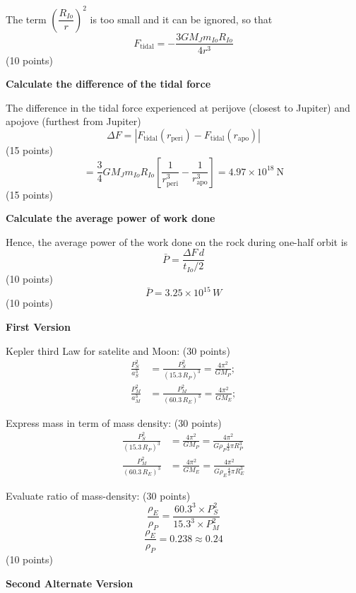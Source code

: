 The term $\left(\dfrac{R_{Io}}{r}\right)^2$ is too small and it can be
ignored, so that
\[
  F_{\mathrm{tidal}} = -\frac{3GM_J m_{Io} R_{Io}}{4r^3}
\]
\hfill(10 points)

\medskip
\textbf{Calculate the difference of the tidal force}

The difference in the tidal force experienced at perijove (closest to Jupiter)
and apojove (furthest from Jupiter)
\[
  \Delta F = \left|F_{\mathrm{tidal}}(r_{\mathrm{peri}})
    - F_{\mathrm{tidal}}(r_{\mathrm{apo}})\right|
\]
\hfill(15 points)
\[
  = \frac{3}{4}GM_J m_{Io} R_{Io}
    \left[\frac{1}{r_{\mathrm{peri}}^3} - \frac{1}{r_{\mathrm{apo}}^3}\right]
  = 4.97\times10^{18}\ \mathrm{N}
\]
\hfill(15 points)

\medskip
\textbf{Calculate the average power of work done}

Hence, the average power of the work done on the rock during one-half orbit
is
\[
  \bar P = \frac{\Delta F\,d}{t_{Io}/2}
\]
\hfill(10 points)
\[
  \bar P = 3.25\times10^{15}\,W
\]
\hfill(10 points)

\textbf{First Version}

Kepler third Law for satelite %
and Moon: \hfill(30 points)
\begin{align*}
  \frac{P_S^2}{a_S^3} &= \frac{P_S^2}{(15.3\,R_P)^3} = \frac{4\pi^2}{GM_P}; \\
  \frac{P_M^2}{a_M^3} &= \frac{P_M^2}{(60.3\,R_E)^3} = \frac{4\pi^2}{GM_E};
\end{align*}

Express mass in term of mass density: \hfill(30 points)
\begin{align*}
  \frac{P_S^2}{(15.3\,R_P)^3} &= \frac{4\pi^2}{GM_P}
    = \frac{4\pi^2}{G\rho_P \frac{4}{3}\pi R_P^3} \\
  \frac{P_M^2}{(60.3\,R_E)^3} &= \frac{4\pi^2}{GM_E}
    = \frac{4\pi^2}{G\rho_E \frac{4}{3}\pi R_E^3}
\end{align*}

Evaluate ratio of mass-density: \hfill(30 points)
\[ \frac{\rho_E}{\rho_P}
   = \frac{60.3^3 \times P_S^2}{15.3^3 \times P_M^2} \]
\[ \frac{\rho_E}{\rho_P} = 0.238 \approx 0.24 \]
\hfill(10 points)

\textbf{Second Alternate Version}

